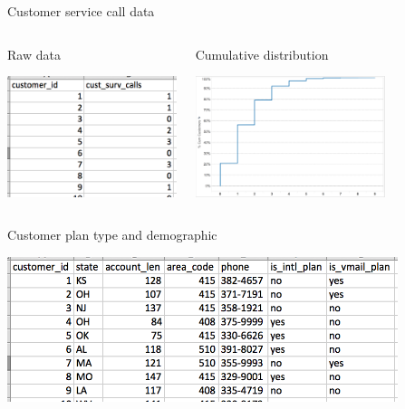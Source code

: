 \documentclass[10pt]{beamer}
\begin{document}
    \begin{frame}{Customer service call data}
        \begin{columns}[c]
          \begin{block}{Raw data}
            \begin{center}
              \includegraphics[height=100pt]{../graphs/dataset_customer_support}
            \end{center}
          \end{block}
          \begin{block}{Cumulative distribution}
            \begin{center}
              \includegraphics[height=100pt]{../graphs/dataset_cust_call_chart}
            \end{center}
          \end{block}
        \end{columns}
    \end{frame}

    \begin{frame}{Customer plan type and demographic}
        \begin{center}
          \includegraphics[height=120pt]{../graphs/dataset_customer_account}
        \end{center}
    \end{frame}
\end{document}
